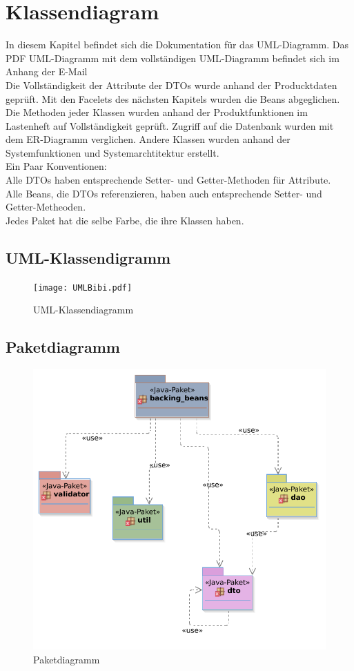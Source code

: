 \documentclass{article}
\begin{document}
\section{Klassendiagram}
In diesem Kapitel befindet sich die Dokumentation für das UML-Diagramm. Das PDF UML-Diagramm mit dem vollständigen  UML-Diagramm befindet sich im Anhang der E-Mail\\
Die Vollständigkeit der Attribute der DTOs wurde anhand der Producktdaten geprüft.
Mit den Facelets des nächsten Kapitels wurden die Beans  abgeglichen.
Die Methoden jeder Klassen wurden anhand der Produktfunktionen im Lastenheft auf Vollständigkeit geprüft. Zugriff auf die Datenbank wurden mit dem ER-Diagramm verglichen. Andere Klassen wurden anhand der Systemfunktionen und Systemarchtitektur erstellt.\\
Ein Paar Konventionen:\\
Alle DTOs haben entsprechende Setter- und Getter-Methoden für Attribute.\\
Alle Beans, die DTOs referenzieren, haben auch entsprechende Setter- und Getter-Metheoden.\\
Jedes Paket hat die selbe Farbe, die ihre Klassen haben.
\subsection{UML-Klassendigramm}

\begin{figure}[H]
\hypertarget{Session}{}
    \texttt{[image: UMLBibi.pdf]}
    \caption{UML-Klassendiagramm}
    \label{fig:UML-Klassendkígrramm}
\end{figure}

\subsection{Paketdiagramm}

\begin{figure}[H]
    \centering
    \includegraphics[scale=0.5]{Paketdiagramm.pdf}
    \caption{Paketdiagramm}
    \label{fig:UML-Paketdkígrramm}
\end{figure}
\end{document}
